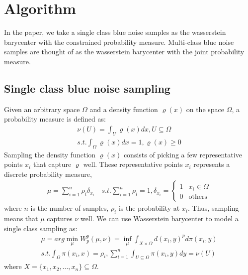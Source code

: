 \section{Algorithm}

In the paper,
we take a single class blue noise samples  as the wasserstein barycenter with the constrained probability measure.
Multi-class blue noise samples are thought of as the wasserstein barycenter with the joint probability measure.
\subsection{Single class blue noise sampling}
Given an arbitrary space $\Omega$ and a density function $\varrho(x)$ on the space $\Omega$,
a probability measure is defined as:
\begin{equation}\label{probability-measure}
  \begin{split}
  \nu(U)=\int_U\varrho(x)dx, U\subseteq\Omega \\
  s.t. \int_{\Omega}\varrho(x)dx=1,\varrho(x)\geq0
  \end{split}
\end{equation}
Sampling the density function $\varrho(x)$ consists of picking a few representative points $x_i$
that capture $\varrho$ well.
These representative points $x_i$ represents a discrete probability measure,
\begin{equation*}
\begin{split}
  \mu=\sum\limits_{i=1}^n\rho_i\delta_{x_i} \quad
  s.t. \sum\limits_{i=1}^n\rho_i=1,  \delta_{x_i}= \left\{ \begin{array}{ll}
  1 & x_i\in\Omega\\
  0 & \textrm{others}
  \end{array} \right.
  \end{split}
\end{equation*}
where $n$ is the number of samples,
$\rho_i$ is the probability at $x_i$.
Thus,
sampling means that $\mu$ captures $\nu$ well.
We can use Wasserstein barycenter to model a single class sampling as:
\begin{equation}\label{single-class-problem}
\begin{split}
 \mu=arg\min\limits_\mu W_p^p(\mu,\nu)=\inf\limits_\mu\int_{X\times\Omega}d(x_i,y)^pd\pi(x_i,y)\\
 s.t. \int_\Omega\pi(x_i,x)=\rho_i, \sum\limits_{i=1}^n\int_{U\subseteq\Omega}\pi(x_i,y)dy=\nu(U)
 \end{split}
\end{equation}
where $X=\{x_1,x_2,...,x_n\}\subseteq\Omega$.

